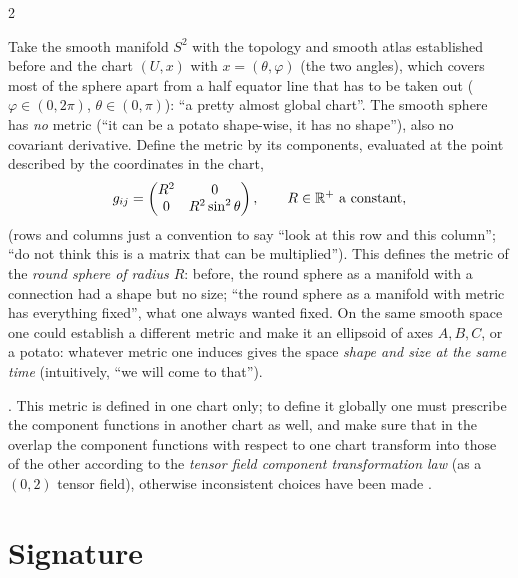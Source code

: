 \begin{paracol}{2}
\begin{example}\label{ex:c10-sphere}
Take the smooth manifold $S^2$ with the topology and smooth atlas established before and the chart $(U,x)$ with $x=(\theta,\varphi)$ (the two angles), which covers most of the sphere apart from a half equator line that has to be taken out ($\varphi\in(0,2\pi)$, $\theta\in(0,\pi)$): ``a pretty almost global chart''. The smooth sphere has \emph{no} metric (``it can be a potato shape-wise, it has no shape''), also no covariant derivative. Define the metric by its components, evaluated at the point described by the coordinates in the chart,
\[
  g_{ij}=\begin{pmatrix}R^2&0\\0&R^2\sin^2\theta\end{pmatrix},\qquad R\in\mathbb{R}^+\text{ a constant},
\]
(rows and columns just a convention to say ``look at this row and this column''; ``do not think this is a matrix that can be multiplied''). This defines the metric of the \emph{round sphere of radius $R$}: before, the round sphere as a manifold with a connection had a shape but no size; ``the round sphere as a manifold with metric has everything fixed'', what one always wanted fixed. On the same smooth space one could establish a different metric and make it an ellipsoid of axes $A,B,C$, or a potato: whatever metric one induces gives the space \emph{shape and size at the same time} (intuitively, ``we will come to that'').
\end{example}
.
This metric is defined in one chart only; to define it globally one must prescribe the component functions in another chart as well, and make sure that in the overlap the component functions with respect to one chart transform into those of the other according to the \emph{tensor field component transformation law} (as a $(0,2)$ tensor field), otherwise inconsistent choices have been made .

\section{Signature}\label{sec:c10-signature}


\end{paracol}
